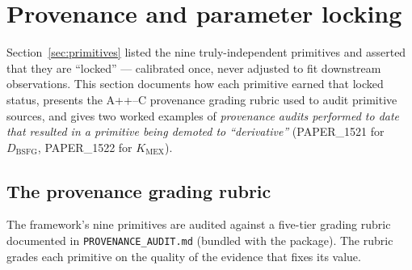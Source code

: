 
\section{Provenance and parameter locking}
\label{sec:provenance}

Section~\ref{sec:primitives} listed the nine truly-independent
primitives and asserted that they are ``locked'' --- calibrated once,
never adjusted to fit downstream observations. This section
documents how each primitive earned that locked status, presents the
A++--C provenance grading rubric used to audit primitive sources,
and gives two worked examples of \emph{provenance audits performed
to date that resulted in a primitive being demoted to ``derivative''}
(PAPER\_1521 for $D_{\text{BSFG}}$, PAPER\_1522 for $K_{\text{MEX}}$).

\subsection{The provenance grading rubric}
\label{sec:provenance_rubric}

The framework's nine primitives are audited against a five-tier
grading rubric documented in \texttt{PROVENANCE\_AUDIT.md}
(bundled with the package). The rubric grades each primitive on the
quality of the evidence that fixes its value.

